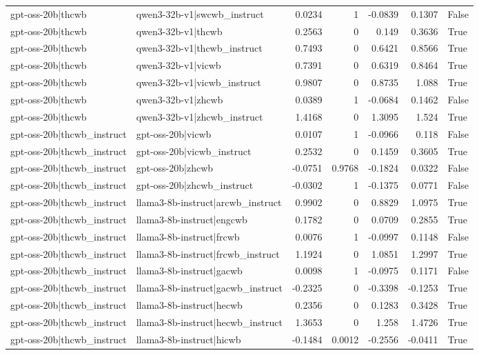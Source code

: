 \begin{table}
\begin{tabular}{l l r r r r l}
gpt-oss-20b|thcwb & qwen3-32b-v1|swcwb_instruct & 0.0234 & 1 & -0.0839 & 0.1307 & False \\
gpt-oss-20b|thcwb & qwen3-32b-v1|thcwb & 0.2563 & 0 & 0.149 & 0.3636 & True \\
gpt-oss-20b|thcwb & qwen3-32b-v1|thcwb_instruct & 0.7493 & 0 & 0.6421 & 0.8566 & True \\
gpt-oss-20b|thcwb & qwen3-32b-v1|vicwb & 0.7391 & 0 & 0.6319 & 0.8464 & True \\
gpt-oss-20b|thcwb & qwen3-32b-v1|vicwb_instruct & 0.9807 & 0 & 0.8735 & 1.088 & True \\
gpt-oss-20b|thcwb & qwen3-32b-v1|zhcwb & 0.0389 & 1 & -0.0684 & 0.1462 & False \\
gpt-oss-20b|thcwb & qwen3-32b-v1|zhcwb_instruct & 1.4168 & 0 & 1.3095 & 1.524 & True \\
gpt-oss-20b|thcwb_instruct & gpt-oss-20b|vicwb & 0.0107 & 1 & -0.0966 & 0.118 & False \\
gpt-oss-20b|thcwb_instruct & gpt-oss-20b|vicwb_instruct & 0.2532 & 0 & 0.1459 & 0.3605 & True \\
gpt-oss-20b|thcwb_instruct & gpt-oss-20b|zhcwb & -0.0751 & 0.9768 & -0.1824 & 0.0322 & False \\
gpt-oss-20b|thcwb_instruct & gpt-oss-20b|zhcwb_instruct & -0.0302 & 1 & -0.1375 & 0.0771 & False \\
gpt-oss-20b|thcwb_instruct & llama3-8b-instruct|arcwb_instruct & 0.9902 & 0 & 0.8829 & 1.0975 & True \\
gpt-oss-20b|thcwb_instruct & llama3-8b-instruct|engcwb & 0.1782 & 0 & 0.0709 & 0.2855 & True \\
gpt-oss-20b|thcwb_instruct & llama3-8b-instruct|frcwb & 0.0076 & 1 & -0.0997 & 0.1148 & False \\
gpt-oss-20b|thcwb_instruct & llama3-8b-instruct|frcwb_instruct & 1.1924 & 0 & 1.0851 & 1.2997 & True \\
gpt-oss-20b|thcwb_instruct & llama3-8b-instruct|gacwb & 0.0098 & 1 & -0.0975 & 0.1171 & False \\
gpt-oss-20b|thcwb_instruct & llama3-8b-instruct|gacwb_instruct & -0.2325 & 0 & -0.3398 & -0.1253 & True \\
gpt-oss-20b|thcwb_instruct & llama3-8b-instruct|hecwb & 0.2356 & 0 & 0.1283 & 0.3428 & True \\
gpt-oss-20b|thcwb_instruct & llama3-8b-instruct|hecwb_instruct & 1.3653 & 0 & 1.258 & 1.4726 & True \\
gpt-oss-20b|thcwb_instruct & llama3-8b-instruct|hicwb & -0.1484 & 0.0012 & -0.2556 & -0.0411 & True \\

\end{tabular}
\end{table}
